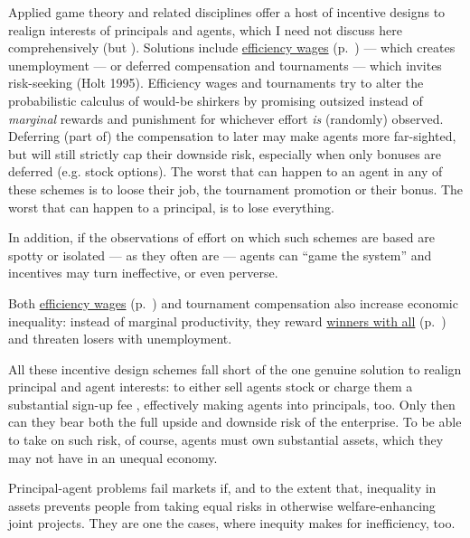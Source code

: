 Applied game theory and related disciplines offer a host of incentive designs to realign interests of principals and agents, which I need not discuss here comprehensively (but \citealt{Tirole2006}). Solutions include \hyperref[sec:efficiencywages]{efficiency wages} (p.~\pageref{sec:efficiencywages}) --- which creates unemployment --- or deferred compensation and tournaments --- which invites risk-seeking (Holt 1995). Efficiency wages and tournaments try to alter the probabilistic calculus of would-be shirkers by promising outsized instead of \emph{marginal} rewards and punishment for whichever effort \emph{is} (randomly) observed. Deferring (part of) the compensation to later may make agents more far-sighted, but will still strictly cap their downside risk, especially when only bonuses are deferred (e.g. stock options). The worst that can happen to an agent in any of these schemes is to loose their job, the tournament promotion or their bonus. The worst that can happen to a principal, is to lose everything.

In addition, if the observations of effort on which such schemes are based are spotty or isolated --- as they often are --- agents can ``game the system'' and incentives may turn ineffective, or even perverse. 

Both \hyperref[sec:efficiencywages]{efficiency wages} (p.~\pageref{sec:efficiencywages}) and tournament compensation also increase economic inequality: instead of marginal productivity, they reward \hyperref[sec:winner-take-all]{winners with all} (p.~\pageref{sec:winner-take-all}) and threaten losers with unemployment.

All these incentive design schemes fall short of the one genuine solution to realign principal and agent interests: to either sell agents stock or charge them a substantial sign-up fee \citep{Tirole2006}, effectively making agents into principals, too. Only then can they bear both the full upside and downside risk of the enterprise. To be able to take on such risk, of course, agents must own substantial assets, which they may not have in an unequal economy.

Principal-agent problems fail markets if, and to the extent that, inequality in assets prevents people from taking equal risks in otherwise welfare-enhancing joint projects. They are one the cases, where inequity makes for inefficiency, too. %

